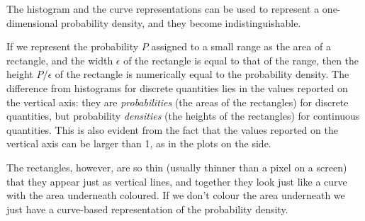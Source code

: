 \documentclass[
  a4paper,
  DIV=11,
  numbers=noendperiod,
  oneside]{scrreprt}
\begin{document}
The histogram and the curve representations can be used to represent a
one-dimensional probability density, and they become indistinguishable.

If we represent the probability \(P\) assigned to a small range as the
area of a rectangle, and the width \(\epsilon\) of the rectangle is
equal to that of the range, then the height \(P/\epsilon\) of the
rectangle is numerically equal to the probability density. The
difference from histograms for discrete quantities lies in the values
reported on the vertical axis: they are \emph{probabilities} (the areas
of the rectangles) for discrete quantities, but probability
\emph{densities} (the heights of the rectangles) for continuous
quantities. This is also evident from the fact that the values reported
on the vertical axis can be larger than 1, as in the plots on the side.

The rectangles, however, are so thin (usually thinner than a pixel on a
screen) that they appear just as vertical lines, and together they look
just like a curve with the area underneath coloured. If we don't colour
the area underneath we just have a curve-based representation of the
probability density.
\end{document}
